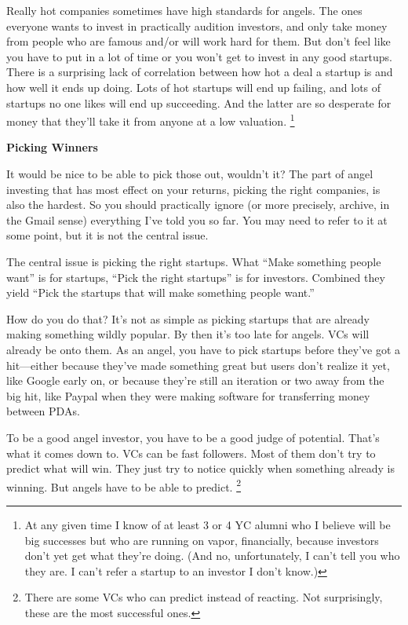 \documentclass[12pt]{book}
\begin{document}
Really hot companies sometimes have high standards for angels. The ones
everyone wants to invest in practically audition investors, and only
take money from people who are famous and/or will work hard for them.
But don't feel like you have to put in a lot of time or you won't get to
invest in any good startups. There is a surprising lack of correlation
between how hot a deal a startup is and how well it ends up doing. Lots
of hot startups will end up failing, and lots of startups no one likes
will end up succeeding. And the latter are so desperate for money that
they'll take it from anyone at a low valuation. \footnote{At any given time I know of at least 3 or 4 YC alumni who I
believe will be big successes but who are running on vapor, financially,
because investors don't yet get what they're doing. (And no,
unfortunately, I can't tell you who they are. I can't refer a startup to
an investor I don't know.)}

\textbf{Picking Winners}

It would be nice to be able to pick those out, wouldn't it? The part of
angel investing that has most effect on your returns, picking the right
companies, is also the hardest. So you should practically ignore (or
more precisely, archive, in the Gmail sense) everything I've told you so
far. You may need to refer to it at some point, but it is not the
central issue.

The central issue is picking the right startups. What ``Make something
people want'' is for startups, ``Pick the right startups'' is for
investors. Combined they yield ``Pick the startups that will make
something people want.''

How do you do that? It's not as simple as picking startups that are
already making something wildly popular. By then it's too late for
angels. VCs will already be onto them. As an angel, you have to pick
startups before they've got a hit---either because they've made
something great but users don't realize it yet, like Google early on, or
because they're still an iteration or two away from the big hit, like
Paypal when they were making software for transferring money between
PDAs.

To be a good angel investor, you have to be a good judge of potential.
That's what it comes down to. VCs can be fast followers. Most of them
don't try to predict what will win. They just try to notice quickly when
something already is winning. But angels have to be able to predict.
\footnote{There are some VCs who can predict instead of reacting. Not
surprisingly, these are the most successful ones.}
\end{document}
